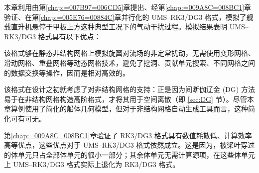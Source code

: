 本章利用由第\ref{chap:=007B97=006CD5}章提出、经第\ref{chap:=009A8C=008BC1}章验证、在第\ref{chap:=005E76=00884C}章并行化的
UMS–RK3/DG3 格式，模拟了舰载直升机悬停于甲板上方这种典型工况下的气动干扰过程。模拟结果表明 UMS–RK3/DG3 格式具有以下优点：
\begin{description}[wide]
\item [{能够高效地模拟旋翼对流场的扰动}] 该格式够在静态非结构网格上模拟旋翼对流场的非定常扰动，无需使用变形网格、滑动网格、重叠网格等动态网格技术，避免了挖洞、贡献单元搜索、不同网格之间的数据交换等操作，因而是相对高效的。
\item [{能够处理具有复杂几何外形的船体}] 该格式在设计之初就考虑了对非结构网格的支持：正是因为间断伽辽金 (DG) 方法易于在非结构网格构造高阶格式，才将其用于空间离散（即
\ref{sec:DG} 节）。尽管本章算例使用了简化的船体几何模型，但对于非结构网格自动生成工具而言，这种简化可有可无。
\item [{数值耗散低、计算效率高}] 第\ref{chap:=009A8C=008BC1}章验证了 RK3/DG3 格式具有数值耗散低、计算效率高等优点，这些优点对于
UMS–RK3/DG3 格式依然成立。这是因为，被桨叶穿过的体单元只占全部体单元的很小一部分；其余体单元无需计算源项，在这些体单元上
UMS–RK3/DG3 格式实际上退化为 RK3/DG3 格式。
\end{description}


